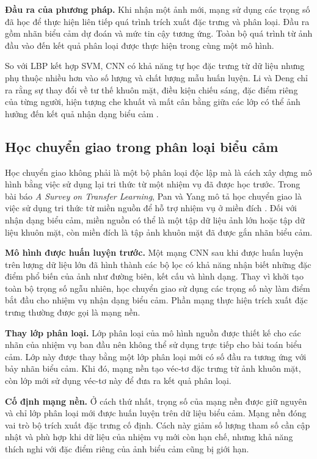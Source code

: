 \documentclass[../LuanVan.tex]{subfiles}
\begin{document}
\noindent\textbf{Đầu ra của phương pháp.} Khi nhận một ảnh mới, mạng sử dụng các trọng số đã học để thực hiện liên tiếp quá trình trích xuất đặc trưng và phân loại. Đầu ra gồm nhãn biểu cảm dự đoán và mức tin cậy tương ứng. Toàn bộ quá trình từ ảnh đầu vào đến kết quả phân loại được thực hiện trong cùng một mô hình.

So với LBP kết hợp SVM, CNN có khả năng tự học đặc trưng từ dữ liệu nhưng phụ thuộc nhiều hơn vào số lượng và chất lượng mẫu huấn luyện. Li và Deng chỉ ra rằng sự thay đổi về tư thế khuôn mặt, điều kiện chiếu sáng, đặc điểm riêng của từng người, hiện tượng che khuất và mất cân bằng giữa các lớp có thể ảnh hưởng đến kết quả nhận dạng biểu cảm \cite{li2022deepfer}.

\subsection{Học chuyển giao trong phân loại biểu cảm}
\label{subsection:2.3.3}

Học chuyển giao không phải là một bộ phân loại độc lập mà là cách xây dựng mô hình bằng việc sử dụng lại tri thức từ một nhiệm vụ đã được học trước. Trong bài báo \textit{A Survey on Transfer Learning}, Pan và Yang mô tả học chuyển giao là việc sử dụng tri thức từ miền nguồn để hỗ trợ nhiệm vụ ở miền đích \cite{pan2010transfer}. Đối với nhận dạng biểu cảm, miền nguồn có thể là một tập dữ liệu ảnh lớn hoặc tập dữ liệu khuôn mặt, còn miền đích là tập ảnh khuôn mặt đã được gắn nhãn biểu cảm.

\noindent\textbf{Mô hình được huấn luyện trước.} Một mạng CNN sau khi được huấn luyện trên lượng dữ liệu lớn đã hình thành các bộ lọc có khả năng nhận biết những đặc điểm phổ biến của ảnh như đường biên, kết cấu và hình dạng. Thay vì khởi tạo toàn bộ trọng số ngẫu nhiên, học chuyển giao sử dụng các trọng số này làm điểm bắt đầu cho nhiệm vụ nhận dạng biểu cảm. Phần mạng thực hiện trích xuất đặc trưng thường được gọi là mạng nền.

\noindent\textbf{Thay lớp phân loại.} Lớp phân loại của mô hình nguồn được thiết kế cho các nhãn của nhiệm vụ ban đầu nên không thể sử dụng trực tiếp cho bài toán biểu cảm. Lớp này được thay bằng một lớp phân loại mới có số đầu ra tương ứng với bảy nhãn biểu cảm. Khi đó, mạng nền tạo véc-tơ đặc trưng từ ảnh khuôn mặt, còn lớp mới sử dụng véc-tơ này để đưa ra kết quả phân loại.

\noindent\textbf{Cố định mạng nền.} Ở cách thứ nhất, trọng số của mạng nền được giữ nguyên và chỉ lớp phân loại mới được huấn luyện trên dữ liệu biểu cảm. Mạng nền đóng vai trò bộ trích xuất đặc trưng cố định. Cách này giảm số lượng tham số cần cập nhật và phù hợp khi dữ liệu của nhiệm vụ mới còn hạn chế, nhưng khả năng thích nghi với đặc điểm riêng của ảnh biểu cảm cũng bị giới hạn.
\end{document}
